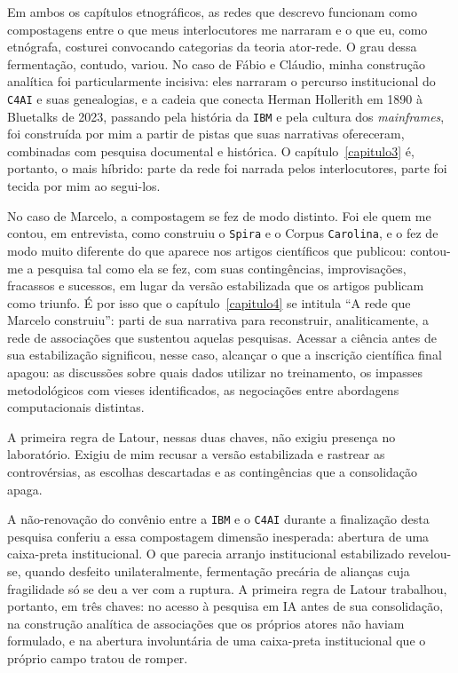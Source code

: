 Em ambos os capítulos etnográficos, as redes que descrevo funcionam como compostagens entre o que meus interlocutores me narraram e o que eu, como etnógrafa, costurei convocando categorias da teoria ator-rede. O grau dessa fermentação, contudo, variou. No caso de Fábio e Cláudio, minha construção analítica foi particularmente incisiva: eles narraram o percurso institucional do \texttt{C4AI} e suas genealogias, e a cadeia que conecta Herman Hollerith em 1890 à Bluetalks de 2023, passando pela história da \texttt{IBM} e pela cultura dos \textit{mainframes}, foi construída por mim a partir de pistas que suas narrativas ofereceram, combinadas com pesquisa documental e histórica. O capítulo~\ref{capitulo3} é, portanto, o mais híbrido: parte da rede foi narrada pelos interlocutores, parte foi tecida por mim ao segui-los.

No caso de Marcelo, a compostagem se fez de modo distinto. Foi ele quem me contou, em entrevista, como construiu o \texttt{Spira} e o Corpus \texttt{Carolina}, e o fez de modo muito diferente do que aparece nos artigos científicos que publicou: contou-me a pesquisa tal como ela se fez, com suas contingências, improvisações, fracassos e sucessos, em lugar da versão estabilizada que os artigos publicam como triunfo. É por isso que o capítulo~\ref{capitulo4} se intitula \enquote{A rede que Marcelo construiu}: parti de sua narrativa para reconstruir, analiticamente, a rede de associações que sustentou aquelas pesquisas. Acessar a ciência antes de sua estabilização significou, nesse caso, alcançar o que a inscrição científica final apagou: as discussões sobre quais dados utilizar no treinamento, os impasses metodológicos com vieses identificados, as negociações entre abordagens computacionais distintas.

A primeira regra de Latour, nessas duas chaves, não exigiu presença no laboratório. Exigiu de mim recusar a versão estabilizada e rastrear as controvérsias, as escolhas descartadas e as contingências que a consolidação apaga.

A não-renovação do convênio entre a \texttt{IBM} e o \texttt{C4AI} durante a finalização desta pesquisa conferiu a essa compostagem dimensão inesperada: abertura de uma caixa-preta institucional. O que parecia arranjo institucional estabilizado revelou-se, quando desfeito unilateralmente, fermentação precária de alianças cuja fragilidade só se deu a ver com a ruptura. A primeira regra de Latour trabalhou, portanto, em três chaves: no acesso à pesquisa em IA antes de sua consolidação, na construção analítica de associações que os próprios atores não haviam formulado, e na abertura involuntária de uma caixa-preta institucional que o próprio campo tratou de romper.

